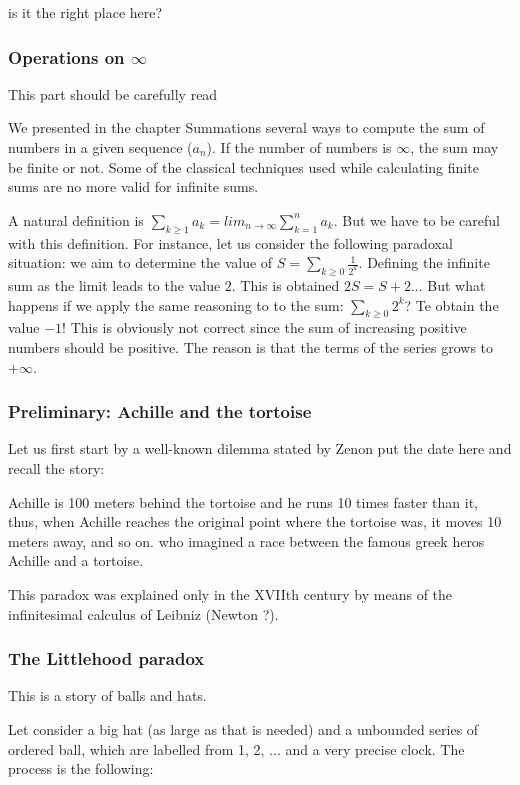 {\Denis is it the right place here?}

\subsubsection{Operations on $\infty$}

{\Denis This part should be carefully read}

We presented in the chapter Summations several ways to compute the sum of numbers in a given sequence ($a_n$).
If the number of numbers is $\infty$, the sum may be finite or not. 
Some of the classical techniques used while calculating finite sums are no more valid for infinite sums. 


A natural definition is $\sum_{k \geq 1} a_k = lim_{n \rightarrow \infty} \sum_{k=1}^{n} a_k$.
But we have to be careful with this definition. 
For instance, let us consider the following paradoxal situation:
we aim to determine the value of $S = \sum_{k \geq 0} \frac{1}{2^k}$.
Defining the infinite sum as the limit leads to the value $2$. 
This is obtained $2S = S+2$...
But what happens if we apply the same reasoning to to the sum: $\sum _{k \geq 0} 2^k$?
Te obtain the value $-1$!
This is obviously not correct since the sum of increasing positive numbers should be positive.
The reason is that the terms of the series grows to $+\infty$.

\subsubsection{Preliminary: Achille and the tortoise}

Let us first start by a well-known dilemma stated by Zenon {\Denis put the date here and recall the story:}

Achille is 100 meters behind the tortoise and he runs 10 times faster than it, thus, when Achille reaches the original point where the tortoise was, it moves 10 meters away, and so on.
who imagined a race between the famous greek heros Achille and a tortoise. 

This paradox was explained only in the XVIIth century by means of the infinitesimal calculus of Leibniz (Newton ?). 


\subsubsection{The Littlehood paradox}

This is a story of balls and hats.

Let consider a big hat (as large as that is needed) and a unbounded series of ordered ball,
which are labelled from 1, 2, ... and a very precise clock. 
The process is the following:

